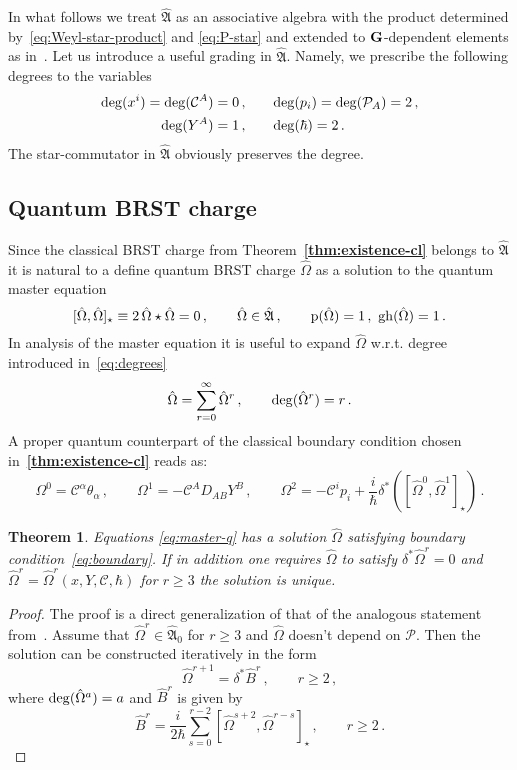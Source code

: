 \documentclass[a4paper,11pt]{amsart}
\newtheorem{thm}{Theorem}
\numberwithin{thm}{section} %
\numberwithin{equation}{section} %
\numberwithin{figure}{section} %
\newcommand{\bref}[1]{{\bf \ref{#1}}}
\newcommand{\qcommut}[2]{[#1,#2]_\star}
\newcommand{\gh}[1]{{\rm gh}(#1)}
\newcommand{\p}[1]{{\rm p}(#1)}
\renewcommand{\deg}[1]{{\rm deg}(#1)}
\renewcommand{\:}{{\rm\, :\,}}
\def\cP{{\mathcal P}}
\def\cc{{\mathcal C}}
\def\qA{{\hat{\mathfrak A}}}
\def\G{{ \bf G}}
\begin{document}
In what follows we treat $\qA$ as an associative algebra with the 
product determined by~\eqref{eq:Weyl-star-product} and \eqref{eq:P-star}
and extended to $\G$-dependent elements as in~\cite{[GL]}.  Let us
introduce a useful grading in $\qA$.  Namely,
we prescribe the following degrees to the variables
\begin{equation}
\begin{split}
  \label{eq:degrees}
  \deg{x^i}=\deg{\cc^A}=0\,,&\qquad \deg{p_i}=\deg{\cP_A}=2 \,,\\
  \deg{Y^A}=1\,,& \qquad  \deg{\hbar}=2\,.
\end{split}
\end{equation}
The star-commutator in $\qA$ obviously preserves the degree.

\subsection{Quantum BRST charge}
Since the classical BRST charge from Theorem~\bref{thm:existence-cl}
belongs to $\qA$ it is natural to a define quantum BRST
charge $\hat\Omega$ as a solution to the quantum master equation
\begin{equation} \label{eq:master-q}
\qcommut{{\hat\Omega}}{{\hat\Omega}} \equiv
2\,{\hat\Omega}\star {\hat\Omega}=0\,, 
\qquad {\hat\Omega} \in \qA\,,\qquad \p{\hat\Omega}=1\,,\,\, \gh{\hat\Omega}=1\,.
\end{equation}
In analysis of the master equation it is useful to expand $\hat\Omega$
w.r.t. degree introduced in~\eqref{eq:degrees}
\begin{equation}
  \label{eq:Omega-expansion}
  {\hat\Omega}=\sum^\infty_{r=0} {\hat\Omega}^r\,,\qquad \deg{{\hat\Omega^r}}=r\,.
\end{equation}
A proper quantum counterpart of the classical boundary
condition chosen in~\bref{thm:existence-cl} reads as:
\begin{equation}
\label{eq:boundary}
  \Omega^0=\cc^\alpha \theta_\alpha\,,\qquad
  \Omega^1=-\cc^A D_{AB}Y^B\,,\qquad
  \Omega^2=-\cc^i p_i+\frac{i}{\hbar}\delta^*(\qcommut{\hat\Omega^0}{\hat\Omega^1})\,.
\end{equation}
\begin{thm}\label{thm:existence-q}
Equations \eqref{eq:master-q} has a solution $\hat\Omega$ satisfying
boundary condition~\eqref{eq:boundary}. If in addition
one requires $\hat\Omega$ to satisfy $\delta^*{\hat\Omega}^r=0$
and ${\hat\Omega}^r={\hat\Omega}^r(x,Y,\cc,\hbar)$ for $r\geq 3$ the solution is
unique.
\end{thm}
\begin{proof}
The proof is a direct generalization of that of the analogous
statement from~\cite{[GL]}. Assume that ${\hat\Omega}^r\in \qA_0$ for $r\geq 3$
and ${\hat\Omega}$ doesn't depend on $\cP$. Then the solution can be
constructed iteratively in the form
$$
{\hat\Omega}^{r+1}=\delta^*{\hat B}^r\,,\qquad r\geq 2\,,
$$
where $\deg{{\hat\Omega}^{a}}=a$ and ${\hat B}^r$ is given by
\begin{equation}
\label{eq:B-explicit-q}
{\hat B}^r=\frac{i}{2\hbar}\sum_{s=0}^{r-2}
\qcommut{{\hat\Omega}^{s+2}}{{\hat\Omega}^{r-s}}\,,\qquad r\geq 2\,.
\end{equation}
\end{proof}
\end{document}
